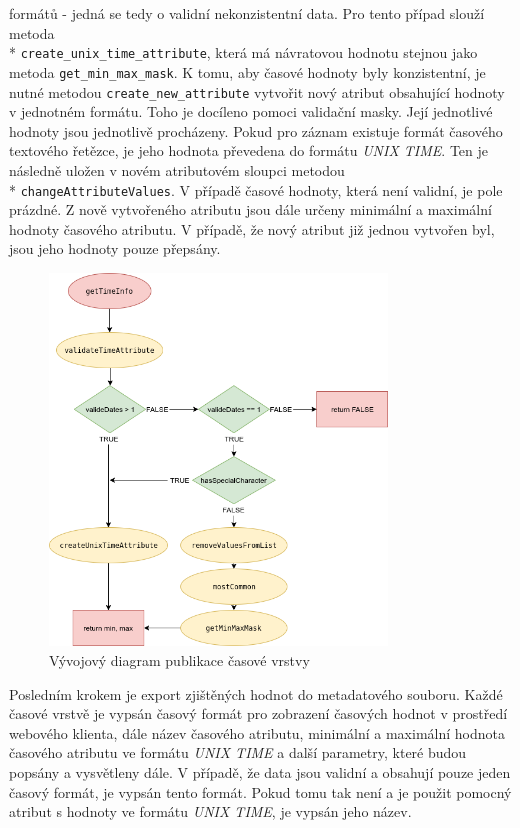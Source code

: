 \begin{enumerate}
{formátů} - jedná se tedy o validní nekonzistentní data. Pro tento
případ slouží metoda \\* \verb|create_unix_time_attribute|, která
má návratovou hodnotu stejnou jako metoda \verb|get_min_max_mask|. K
tomu, aby časové hodnoty byly konzistentní, je nutné metodou
\verb|create_new_attribute| vytvořit nový atribut obsahující
hodnoty v jednotném formátu. Toho je docíleno pomoci validační
masky. Její jednotlivé hodnoty jsou jednotlivě procházeny. Pokud
pro záznam existuje formát časového textového řetězce,
je jeho hodnota převedena do formátu \textit{UNIX TIME}. Ten
je následně uložen v novém atributovém sloupci metodou \\*
\verb|changeAttributeValues|. V případě časové hodnoty, která
není validní, je pole prázdné. Z nově vytvořeného atributu
jsou dále určeny minimální a maximální hodnoty časového
atributu. V případě, že nový atribut již jednou vytvořen byl,
jsou jeho hodnoty pouze přepsány.
\end{enumerate}

\begin{figure}[h!]
\centering
\includegraphics[width=0.8\textwidth]{../img/getTimeInfo.png}
\caption{Vývojový diagram publikace časové vrstvy \cite{flow-chart}}
\label{fig:plugin-chart}
\end{figure}

Posledním krokem je export zjištěných hodnot do metadatového
souboru. Každé časové vrstvě je vypsán časový formát pro zobrazení
časových hodnot v prostředí webového klienta, dále název časového atributu,
minimální a maximální hodnota časového atributu ve formátu \textit{UNIX
TIME} a další parametry, které budou popsány a vysvětleny dále. V
případě, že data jsou validní a obsahují pouze jeden časový formát,
je vypsán tento formát. Pokud tomu tak není a je použit pomocný atribut
s hodnoty ve formátu \textit{UNIX TIME}, je vypsán jeho název.


